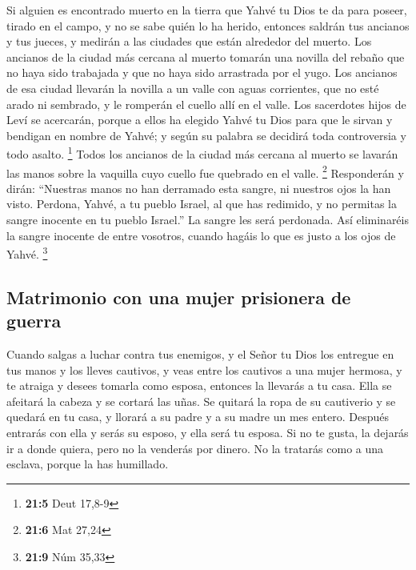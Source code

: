\begin{paracol}{2}
 Si alguien es encontrado muerto en la tierra que Yahvé tu
Dios te da para poseer, tirado en el campo, y no se sabe quién lo ha
herido,  entonces saldrán tus ancianos y tus jueces, y
medirán a las ciudades que están alrededor del muerto. 
Los ancianos de la ciudad más cercana al muerto tomarán una novilla del
rebaño que no haya sido trabajada y que no haya sido arrastrada por el
yugo.  Los ancianos de esa ciudad llevarán la novilla a un
valle con aguas corrientes, que no esté arado ni sembrado, y le romperán
el cuello allí en el valle.  Los sacerdotes hijos de Leví
se acercarán, porque a ellos ha elegido Yahvé tu Dios para que le sirvan
y bendigan en nombre de Yahvé; y según su palabra se decidirá toda
controversia y todo asalto. \footnote{\textbf{21:5} Deut 17,8-9}
 Todos los ancianos de la ciudad más cercana al muerto se
lavarán las manos sobre la vaquilla cuyo cuello fue quebrado en el
valle. \footnote{\textbf{21:6} Mat 27,24}  Responderán y
dirán: ``Nuestras manos no han derramado esta sangre, ni nuestros ojos
la han visto.  Perdona, Yahvé, a tu pueblo Israel, al que
has redimido, y no permitas la sangre inocente en tu pueblo Israel.'' La
sangre les será perdonada.  Así eliminaréis la sangre
inocente de entre vosotros, cuando hagáis lo que es justo a los ojos de
Yahvé. \footnote{\textbf{21:9} Núm 35,33}

\hypertarget{matrimonio-con-una-mujer-prisionera-de-guerra}{%
\subsection{Matrimonio con una mujer prisionera de
guerra}\label{matrimonio-con-una-mujer-prisionera-de-guerra}}

 Cuando salgas a luchar contra tus enemigos, y el Señor
tu Dios los entregue en tus manos y los lleves cautivos, 
y veas entre los cautivos a una mujer hermosa, y te atraiga y desees
tomarla como esposa,  entonces la llevarás a tu casa.
Ella se afeitará la cabeza y se cortará las uñas.  Se
quitará la ropa de su cautiverio y se quedará en tu casa, y llorará a su
padre y a su madre un mes entero. Después entrarás con ella y serás su
esposo, y ella será tu esposa.  Si no te gusta, la
dejarás ir a donde quiera, pero no la venderás por dinero. No la
tratarás como a una esclava, porque la has humillado.

\hypertarget{asegurar-los-derechos-de-herencia-del-primoguxe9nito}{%
}
\end{paracol}

